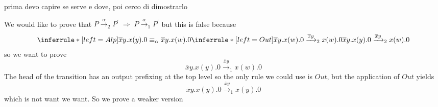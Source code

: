 prima devo capire se serve e dove, poi cerco di dimostrarlo


We would like to prove that $P\xrightarrow{\alpha}_{2}P^{'}\; \Rightarrow\; P\xrightarrow{\alpha}_{1}P^{'}$ but this is false because
\[
  \inferrule* [left=Alp]{
      \overline{x}y.x(y).0 \equiv_{\alpha} \overline{x}y.x(w).0
    \\
      \inferrule* [left=Out]{
      }{
	\overline{x}y.x(w).0\xrightarrow{\overline{x}y}_{2}x(w).0
      }
  }{
    \overline{x}y.x(y).0\xrightarrow{\overline{x}y}_{2}x(w).0
  }
\]
so we want to prove 
\[
  \overline{x}y.x(y).0\xrightarrow{\overline{x}y}_{1}x(w).0
\] 
The head of the transition has an output prefixing at the top level so the only rule we could use is $Out$, but the application of $Out$ yields 
\[
  \overline{x}y.x(y).0\xrightarrow{\overline{x}y}_{1}x(y).0
\] 
which is not want we want. So we prove a weaker version
